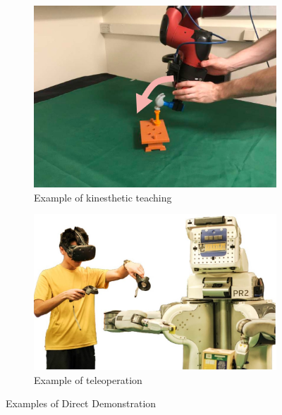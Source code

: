 \begin{figure}[htbp]
     \centering
     \begin{subfigure}[b]{0.45\textwidth}
         \includegraphics[width=\textwidth]{Figures/images/direct_demonstration/kinesthetic.jpg}
         \caption{Example of kinesthetic teaching \cite{johns2021coarse_to_fine}}
         \label{fig:kinesthetic}
     \end{subfigure}
     \hfill
     \begin{subfigure}[b]{0.5\textwidth}
         \includegraphics[width=\textwidth]{Figures/images/direct_demonstration/teleoperation.jpg}
         \caption{Example of teleoperation \cite{zhang2018deep_vr_teleoperation}}
         \label{fig:teleoperation}
     \end{subfigure}
    \hfill
    \caption{Examples of Direct Demonstration}
    \label{fig:direct_demonstrations}
\end{figure}

